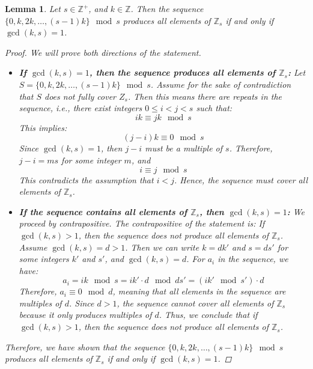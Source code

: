 \documentclass[12pt]{article}
\newcommand{\Z}{\mathbb{Z}} %
\newtheorem{lemma}{Lemma}
\begin{document}
\begin{lemma}
  Let $s \in \Z^+$, and $k \in \Z$.
  Then the sequence $\{0, k, 2k, \ldots, (s - 1)k\} \mod s$ produces all elements of $\Z_s$ if and only if $\gcd(k, s) = 1$.
  \begin{proof}
    We will prove both directions of the statement.
    \begin{itemize}
      \item \textbf{If $\gcd(k, s) = 1$, then the sequence produces all elements of $\Z_s$:}
            Let $S = \{0, k, 2k, \ldots, (s - 1)k\} \mod s$.
            Assume for the sake of contradiction that $S$ does not fully cover $Z_s$.
            Then this means there are repeats in the sequence, i.e., there exist integers $0 \leq i < j < s$ such that:
            \[
              ik \equiv jk \mod s
            \]
            This implies:
            \[
              (j - i)k \equiv 0 \mod s
            \]
            Since $\gcd(k, s) = 1$, then $j - i$ must be a multiple of $s$. Therefore, $j - i = ms$ for some integer $m$, and
            \[
              i \equiv j \mod s
            \]
            This contradicts the assumption that $i < j$.
            Hence, the sequence must cover all elements of $\Z_s$.
      \item \textbf{If the sequence contains all elements of $\Z_s$, then $\gcd(k, s) = 1$:}
            We proceed by contrapositive.
            The contrapositive of the statement is:
            If $\gcd(k, s) > 1$, then the sequence does not produce all elements of $\Z_s$.
            Assume $\gcd(k, s) = d > 1$.
            Then we can write $k = dk'$ and $s = ds'$ for some integers $k'$ and $s'$, and $\gcd(k, s) = d$.
            For $a_i$ in the sequence, we have:
            \[
              a_i = ik \mod s = ik' \cdot d \mod ds' = (ik' \mod s') \cdot d
            \]
            Therefore, $a_i \equiv 0 \mod d$, meaning that all elements in the sequence are multiples of $d$.
            Since $d > 1$, the sequence cannot cover all elements of $\Z_s$ because it only produces multiples of $d$.
            Thus, we conclude that if $\gcd(k, s) > 1$, then the sequence does not produce all elements of $\Z_s$.
    \end{itemize}
    Therefore, we have shown that the sequence $\{0, k, 2k, \ldots, (s - 1)k\} \mod s$ produces all elements of $\Z_s$ if and only if $\gcd(k, s) = 1$.
  \end{proof}
\end{lemma}
\end{document}
